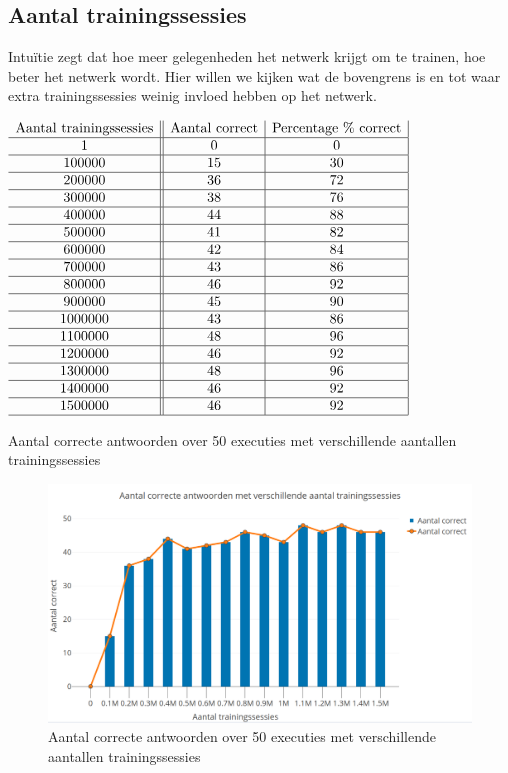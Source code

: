 \subsection{Aantal trainingssessies}
Intu\"itie zegt dat hoe meer gelegenheden het netwerk krijgt om te trainen, hoe beter het netwerk wordt. Hier willen we kijken wat de bovengrens is en tot waar extra trainingssessies weinig invloed hebben op het netwerk.

\begin{table}[ht]
    \centering
      $\begin{array}{c||c|c |}
        \text{Aantal trainingssessies} & \text{Aantal correct} & \text{Percentage \% correct} \\ \hline
        1 & 0 & 0 \\ \hline
        100000 & 15 & 30 \\ \hline
        200000 & 36 & 72 \\ \hline
        300000 & 38 & 76 \\ \hline
        400000 & 44 & 88 \\ \hline
        500000 & 41 & 82 \\ \hline
        600000 & 42 & 84 \\ \hline
        700000 & 43 & 86 \\ \hline
        800000& 46 & 92 \\ \hline
        900000 & 45 & 90 \\ \hline
        1000000 & 43 & 86 \\ \hline
        1100000 & 48 & 96 \\ \hline
        1200000 & 46 & 92 \\ \hline
        1300000 & 48 & 96 \\ \hline
        1400000 & 46 & 92 \\ \hline
        1500000 & 46 & 92 \\ \hline
      \end{array}$
    \caption{Aantal correcte antwoorden over 50 executies met verschillende aantallen trainingssessies}
    \label{tab:training}
\end{table}

\begin{figure}[ht!]
    \centering
    \includegraphics[scale=0.3]{graphs/training.png}
    \caption{Aantal correcte antwoorden over 50 executies met verschillende aantallen trainingssessies}
    \label{fig:training}
\end{figure}

